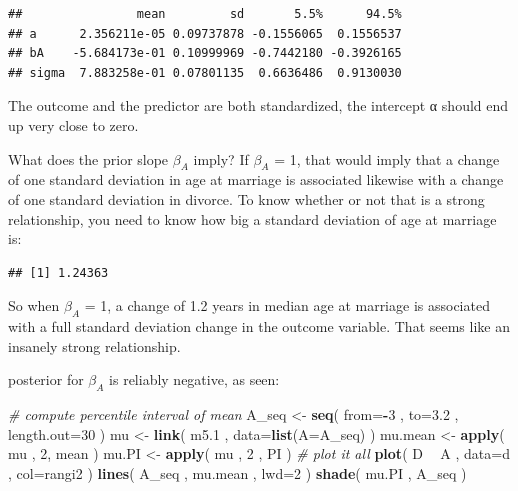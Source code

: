\documentclass[
]{article}
\newenvironment{Shaded}{\begin{snugshade}}{\end{snugshade}}
\newcommand{\CommentTok}[1]{\textcolor[rgb]{0.56,0.35,0.01}{\textit{#1}}}
\newcommand{\DataTypeTok}[1]{\textcolor[rgb]{0.13,0.29,0.53}{#1}}
\newcommand{\DecValTok}[1]{\textcolor[rgb]{0.00,0.00,0.81}{#1}}
\newcommand{\FloatTok}[1]{\textcolor[rgb]{0.00,0.00,0.81}{#1}}
\newcommand{\KeywordTok}[1]{\textcolor[rgb]{0.13,0.29,0.53}{\textbf{#1}}}
\newcommand{\NormalTok}[1]{#1}
\newcommand{\OperatorTok}[1]{\textcolor[rgb]{0.81,0.36,0.00}{\textbf{#1}}}
\newcommand{\StringTok}[1]{\textcolor[rgb]{0.31,0.60,0.02}{#1}}
\begin{document}
\begin{verbatim}
##                mean         sd       5.5%      94.5%
## a      2.356211e-05 0.09737878 -0.1556065  0.1556537
## bA    -5.684173e-01 0.10999969 -0.7442180 -0.3926165
## sigma  7.883258e-01 0.07801135  0.6636486  0.9130030
\end{verbatim}

The outcome and the predictor are both standardized, the intercept α
should end up very close to zero.

What does the prior slope \(\beta_{A}\) imply? If \(\beta_{A}\) = 1,
that would imply that a change of one standard deviation in age at
marriage is associated likewise with a change of one standard deviation
in divorce. To know whether or not that is a strong relationship, you
need to know how big a standard deviation of age at marriage is:

\begin{Shaded}
\end{Shaded}

\begin{verbatim}
## [1] 1.24363
\end{verbatim}

So when \(\beta_{A}\) = 1, a change of 1.2 years in median age at
marriage is associated with a full standard deviation change in the
outcome variable. That seems like an insanely strong relationship.

posterior for \(\beta_{A}\) is reliably negative, as seen:

\begin{Shaded}
\begin{Highlighting}[]
\CommentTok{# compute percentile interval of mean}
\NormalTok{A_seq <-}\StringTok{ }\KeywordTok{seq}\NormalTok{( }\DataTypeTok{from=}\OperatorTok{-}\DecValTok{3}\NormalTok{ , }\DataTypeTok{to=}\FloatTok{3.2}\NormalTok{ , }\DataTypeTok{length.out=}\DecValTok{30}\NormalTok{ )}
\NormalTok{mu <-}\StringTok{ }\KeywordTok{link}\NormalTok{( m5}\FloatTok{.1}\NormalTok{ , }\DataTypeTok{data=}\KeywordTok{list}\NormalTok{(}\DataTypeTok{A=}\NormalTok{A_seq) )}
\NormalTok{mu.mean <-}\StringTok{ }\KeywordTok{apply}\NormalTok{( mu , }\DecValTok{2}\NormalTok{, mean )}
\NormalTok{mu.PI <-}\StringTok{ }\KeywordTok{apply}\NormalTok{( mu , }\DecValTok{2}\NormalTok{ , PI )}
\CommentTok{# plot it all}
\KeywordTok{plot}\NormalTok{( D }\OperatorTok{~}\StringTok{ }\NormalTok{A , }\DataTypeTok{data=}\NormalTok{d , }\DataTypeTok{col=}\NormalTok{rangi2 )}
\KeywordTok{lines}\NormalTok{( A_seq , mu.mean , }\DataTypeTok{lwd=}\DecValTok{2}\NormalTok{ )}
\KeywordTok{shade}\NormalTok{( mu.PI , A_seq )}
\end{Highlighting}
\end{Shaded}
\end{document}
